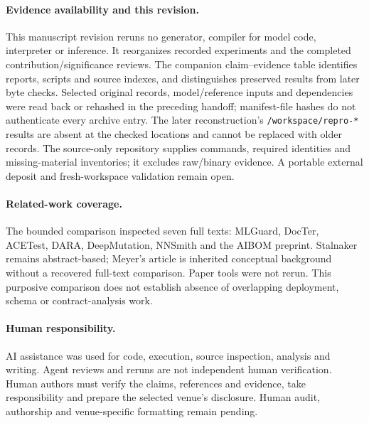 \documentclass[10pt,twocolumn,letterpaper]{article}
\newcommand{\code}[1]{\texttt{#1}}
\begin{document}
\paragraph{Evidence availability and this revision.}
This manuscript revision reruns no generator, compiler for model code, interpreter or inference. It reorganizes recorded experiments and the completed contribution/significance reviews. The companion claim--evidence table identifies reports, scripts and source indexes, and distinguishes preserved results from later byte checks. Selected original records, model/reference inputs and dependencies were read back or rehashed in the preceding handoff; manifest-file hashes do not authenticate every archive entry. The later reconstruction's \code{/workspace/repro-*} results are absent at the checked locations and cannot be replaced with older records. The source-only repository supplies commands, required identities and missing-material inventories; it excludes raw/binary evidence. A portable external deposit and fresh-workspace validation remain open.

\paragraph{Related-work coverage.}
The bounded comparison inspected seven full texts: MLGuard, DocTer, ACETest, DARA, DeepMutation, NNSmith and the AIBOM preprint. Stalnaker remains abstract-based; Meyer's article is inherited conceptual background without a recovered full-text comparison. Paper tools were not rerun. This purposive comparison does not establish absence of overlapping deployment, schema or contract-analysis work.

\paragraph{Human responsibility.}
AI assistance was used for code, execution, source inspection, analysis and writing. Agent reviews and reruns are not independent human verification. Human authors must verify the claims, references and evidence, take responsibility and prepare the selected venue's disclosure. Human audit, authorship and venue-specific formatting remain pending.
\end{document}
